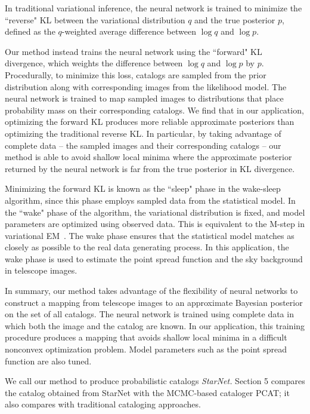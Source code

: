 In traditional variational inference, the neural network is trained to minimize the ``reverse" KL between the variational distribution $q$ and the true posterior $p$, defined as the $q$-weighted average difference between $\log q$ and $\log p$. 

Our method instead trains the neural network using the ``forward" KL divergence, which weights the difference between $\log q$ and $\log p$ by $p$. Procedurally, to minimize this loss, catalogs are sampled from the prior distribution along with corresponding images from the likelihood model. 
The neural network is trained to map sampled images to distributions that place probability mass on their corresponding catalogs. 
We find that in our application, optimizing the forward KL produces more reliable approximate posteriors than optimizing the traditional reverse KL. 
In particular, by taking advantage of complete data -- the sampled images and their corresponding catalogs -- our method is able to avoid shallow local minima where the approximate posterior returned by the neural network is far from the true posterior in KL divergence. 

Minimizing the forward KL is known as the ``sleep" phase in the wake-sleep algorithm, since this phase employs sampled data from the statistical model. 
In the ``wake" phase of the algorithm, the variational distribution is fixed, and model parameters are optimized using observed data. 
This is equivalent to the M-step in variational EM~\cite{Jordan_intro_vi, neal2000varem, Beal2002varem}.
The wake phase ensures that the statistical model matches as closely as possible to the real data generating process. 
In this application, the wake phase is used to estimate the point spread function and the sky background in telescope images. 

In summary, our method takes advantage of the flexibility of neural networks to construct a mapping from telescope images to an approximate Bayesian posterior on the set of all catalogs. 
The neural network is trained using complete data 
in which both the image and the catalog are known. 
In our application, this training procedure produces a mapping that avoids shallow local minima in a difficult nonconvex optimization problem. 
Model parameters such as the point spread function are also tuned. 

We call our method to produce probabilistic catalogs {\itshape StarNet.}
Section 5 compares the catalog obtained from StarNet with the MCMC-based cataloger PCAT;
it also compares with traditional cataloging approaches.

